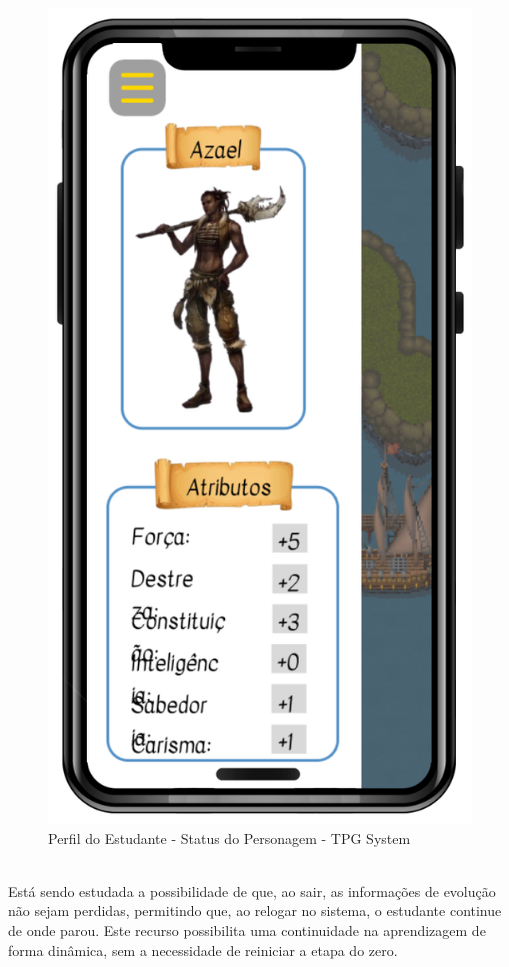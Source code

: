 \begin{figure}[!h]
\centering
\caption{Perfil do Estudante - Status do Personagem - TPG System}%
\label{fig:Tela15}
\includegraphics[scale=0.20]{Illustrations/Tela15.png}
\end{figure}
\\
\pagebreak
Está sendo estudada a possibilidade de que, ao sair, as informações de evolução não sejam perdidas, permitindo que, ao relogar no sistema, o estudante continue de onde parou. Este recurso possibilita uma continuidade na aprendizagem de forma dinâmica, sem a necessidade de reiniciar a etapa do zero.
\\
\pagebreak


